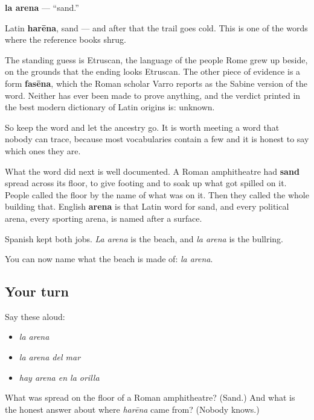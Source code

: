 \begin{cousinweb}
\textbf{la arena} — \textquotedblleft{}sand.\textquotedblright{}

Latin \textbf{harēna}, sand — and after that the trail goes cold. This is one of the words where the reference books shrug.

The standing guess is Etruscan, the language of the people Rome grew up beside, on the grounds that the ending looks Etruscan. The other piece of evidence is a form \textbf{fasēna}, which the Roman scholar Varro reports as the Sabine version of the word. Neither has ever been made to prove anything, and the verdict printed in the best modern dictionary of Latin origins is: unknown.

So keep the word and let the ancestry go. It is worth meeting a word that nobody can trace, because most vocabularies contain a few and it is honest to say which ones they are.

What the word did next is well documented. A Roman amphitheatre had \textbf{sand} spread across its floor, to give footing and to soak up what got spilled on it. People called the floor by the name of what was on it. Then they called the whole building that. English \textbf{arena} is that Latin word for sand, and every political arena, every sporting arena, is named after a surface.

Spanish kept both jobs. \emph{La arena} is the beach, and \emph{la arena} is the bullring.
\end{cousinweb}

\begin{grammarlens}[title={What you've built}]
You can now name what the beach is made of: \emph{la arena}.
\end{grammarlens}

\subsection*{Your turn}
Say these aloud:

\begin{itemize}
\raggedright
  \item \emph{la arena}
  \item \emph{la arena del mar}
  \item \emph{hay arena en la orilla}
\end{itemize}

\begin{tcolorbox}[breakable,colback=teal!4,colframe=teal!35!black,title={Before you move on}]
What was spread on the floor of a Roman amphitheatre? (Sand.) And what is the honest answer about where \emph{harēna} came from? (Nobody knows.)
\end{tcolorbox}
